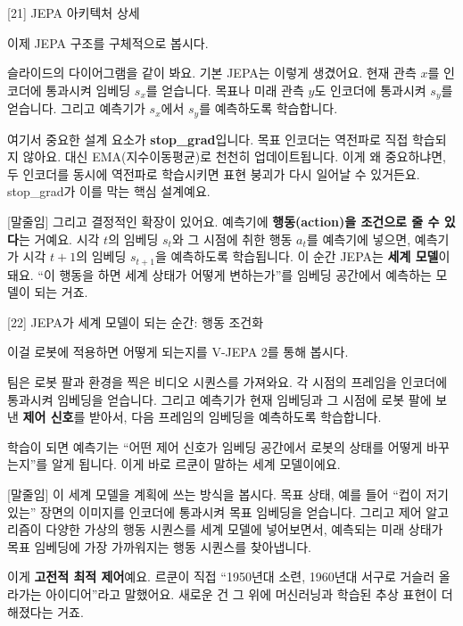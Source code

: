 \documentclass[aspectratio=169,10pt]{beamer}
\newenvironment{script}{%
  \footnotesize
  \setlength{\parskip}{0.5em}
  \setlength{\parindent}{0pt}
}{}
\begin{document}
\begin{frame}{[21] JEPA 아키텍처 상세}
\begin{script}
이제 JEPA 구조를 구체적으로 봅시다.

슬라이드의 다이어그램을 같이 봐요. 기본 JEPA는 이렇게 생겼어요. 현재 관측 $x$를 인코더에 통과시켜 임베딩 $s_x$를 얻습니다. 목표나 미래 관측 $y$도 인코더에 통과시켜 $s_y$를 얻습니다. 그리고 예측기가 $s_x$에서 $s_y$를 예측하도록 학습합니다.

여기서 중요한 설계 요소가 \textbf{stop\_grad}입니다. 목표 인코더는 역전파로 직접 학습되지 않아요. 대신 EMA(지수이동평균)로 천천히 업데이트됩니다. 이게 왜 중요하냐면, 두 인코더를 동시에 역전파로 학습시키면 표현 붕괴가 다시 일어날 수 있거든요. stop\_grad가 이를 막는 핵심 설계예요.

[말줄임] 그리고 결정적인 확장이 있어요. 예측기에 \textbf{행동(action)을 조건으로 줄 수 있다}는 거예요. 시각 $t$의 임베딩 $s_t$와 그 시점에 취한 행동 $a_t$를 예측기에 넣으면, 예측기가 시각 $t+1$의 임베딩 $s_{t+1}$을 예측하도록 학습됩니다. 이 순간 JEPA는 \textbf{세계 모델}이 돼요. ``이 행동을 하면 세계 상태가 어떻게 변하는가''를 임베딩 공간에서 예측하는 모델이 되는 거죠.
\end{script}
\end{frame}

\begin{frame}{[22] JEPA가 세계 모델이 되는 순간: 행동 조건화}
\begin{script}
이걸 로봇에 적용하면 어떻게 되는지를 V-JEPA 2를 통해 봅시다.

팀은 로봇 팔과 환경을 찍은 비디오 시퀀스를 가져와요. 각 시점의 프레임을 인코더에 통과시켜 임베딩을 얻습니다. 그리고 예측기가 현재 임베딩과 그 시점에 로봇 팔에 보낸 \textbf{제어 신호}를 받아서, 다음 프레임의 임베딩을 예측하도록 학습합니다.

학습이 되면 예측기는 ``어떤 제어 신호가 임베딩 공간에서 로봇의 상태를 어떻게 바꾸는지''를 알게 됩니다. 이게 바로 르쿤이 말하는 세계 모델이에요.

[말줄임] 이 세계 모델을 계획에 쓰는 방식을 봅시다. 목표 상태, 예를 들어 ``컵이 저기 있는'' 장면의 이미지를 인코더에 통과시켜 목표 임베딩을 얻습니다. 그리고 제어 알고리즘이 다양한 가상의 행동 시퀀스를 세계 모델에 넣어보면서, 예측되는 미래 상태가 목표 임베딩에 가장 가까워지는 행동 시퀀스를 찾아냅니다.

이게 \textbf{고전적 최적 제어}예요. 르쿤이 직접 ``1950년대 소련, 1960년대 서구로 거슬러 올라가는 아이디어''라고 말했어요. 새로운 건 그 위에 머신러닝과 학습된 추상 표현이 더해졌다는 거죠.
\end{script}
\end{frame}
\end{document}
